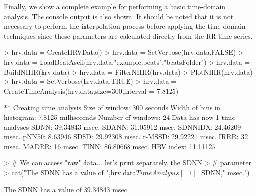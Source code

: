 \documentclass[12pt,lot, lof]{puthesis}
\begin{document}
Finally, we show a complete example for performing a basic time-domain 
analysis. The console output is also shown. It should be noted that it is not 
necessary to perform the interpolation process before applying 
the time-domain techniques since these parameters are calculated directly from 
the RR-time series. \\
\begin{Schunk}
\begin{Sinput}
> hrv.data = CreateHRVData()
> hrv.data = SetVerbose(hrv.data,FALSE)
> hrv.data = LoadBeatAscii(hrv.data,"example.beats","beatsFolder")
> hrv.data = BuildNIHR(hrv.data)
> hrv.data = FilterNIHR(hrv.data)
> PlotNIHR(hrv.data)
> hrv.data = SetVerbose(hrv.data,TRUE)
> hrv.data = CreateTimeAnalysis(hrv.data,size=300,interval = 7.8125)
\end{Sinput}
\begin{Soutput}
** Creating time analysis
   Size of window: 300 seconds 
   Width of bins in histogram: 7.8125 milliseconds 
   Number of windows: 24 
   Data has now 1 time analyses
      SDNN: 39.34843 msec. 
      SDANN: 31.05912 msec. 
      SDNNIDX: 24.46209 msec. 
      pNN50: 8.63946 %
      SDSD: 29.92308 msec.
      r-MSSD: 29.92221 msec.
      IRRR: 32 msec.
      MADRR: 16 msec.
      TINN: 86.80668 msec.
      HRV index: 11.11125 
\end{Soutput}
\begin{Sinput}
> # We can access "raw" data... let's print separately, the SDNN 
> # parameter
> cat("The SDNN has a value of ",hrv.data$TimeAnalysis[[1]]$SDNN," msec.\n")
\end{Sinput}
\begin{Soutput}
The SDNN has a value of  39.34843  msec.
\end{Soutput}
\end{Schunk}
\end{document}
